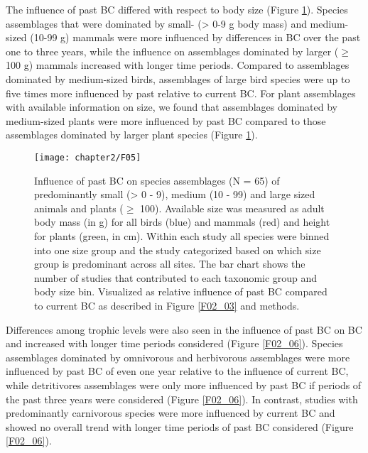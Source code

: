 The influence of past BC differed with respect to body size (Figure \ref{F02_05}). Species assemblages that were dominated by small- (> 0-9 g body mass) and medium-sized (10-99 g) mammals were more influenced by differences in BC over the past one to three years, while the influence on assemblages dominated by larger ($\geq$ 100 g) mammals increased with longer time periods. Compared to assemblages dominated by medium-sized birds, assemblages of large bird species were up to five times more influenced by past relative to current BC. For plant assemblages with available information on size, we found that assemblages dominated by medium-sized plants were more influenced by past BC compared to those assemblages dominated by larger plant species (Figure \ref{F02_05}). 
\begin{figure}[ht]
\centering
\texttt{[image: chapter2/F05]}
\caption{Influence of past BC on species assemblages (N = 65) of predominantly small (> 0 - 9), medium (10 - 99) and large sized animals and plants ($\geq$ 100). Available size was measured as adult body mass (in g) for all birds (blue) and mammals (red) and height for plants (green, in cm). Within each study all species were binned into one size group and the study categorized based on which size group is predominant across all sites. The bar chart shows the number of studies that contributed to each taxonomic group and body size bin. Visualized as relative influence of past BC compared to current BC as described in Figure \ref{F02_03} and methods.}
\label{F02_05}
\end{figure}
Differences among trophic levels were also seen in the influence of past BC on BC and increased with longer time periods considered (Figure \ref{F02_06}). Species assemblages dominated by omnivorous and herbivorous assemblages were more influenced by past BC of even one year relative to the influence of current BC, while detritivores assemblages were only more influenced by past BC if periods of the past three years were considered (Figure \ref{F02_06}). In contrast, studies with predominantly carnivorous species were more influenced by current BC and showed no overall trend with longer time periods of past BC considered (Figure \ref{F02_06}). 
